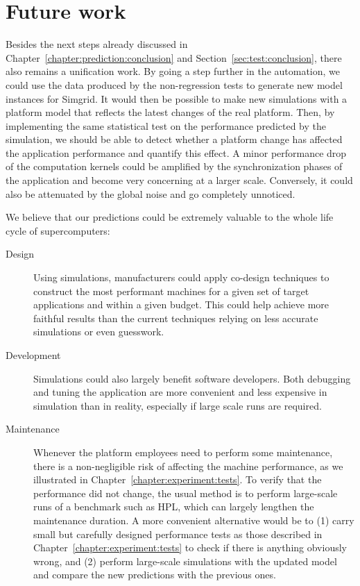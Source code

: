     \section{Future work}%

        Besides the next steps already discussed in Chapter~\ref{chapter:prediction:conclusion} and
        Section~\ref{sec:test:conclusion}, there also remains a unification work. By going a step further in the
        automation, we could use the data produced by the non-regression tests to generate new model instances for
        Simgrid. It would then be possible to make new simulations with a platform model that reflects the latest
        changes of the real platform. Then, by implementing the same statistical test on the performance predicted by
        the simulation, we should be able to detect whether a platform change has affected the application
        performance and quantify this effect. A minor performance drop of the computation kernels could be amplified by
        the synchronization phases of the application and become very concerning at a larger scale. Conversely, it could
        also be attenuated by the global noise and go completely unnoticed.

        We believe that our predictions could be extremely valuable to the whole life cycle of supercomputers:
        \begin{description}
            \item[Design] Using simulations, manufacturers could apply co-design techniques to construct the most
                performant machines for a given set of target applications and within a given budget. This could help
                achieve more faithful results than the current techniques relying on less accurate simulations or even
                guesswork.
            \item[Development] Simulations could also largely benefit software developers. Both debugging and tuning the
                application are more convenient and less expensive in simulation than in reality, especially if large
                scale runs are required.
            \item[Maintenance] Whenever the platform employees need to perform some maintenance, there is a
                non-negligible risk of affecting the machine performance, as we illustrated in
                Chapter~\ref{chapter:experiment:tests}. To verify that the performance did not change, the usual method
                is to perform large-scale runs of a benchmark such as HPL, which can largely lengthen the maintenance
                duration. A more convenient alternative would be to (1) carry small but carefully designed performance
                tests as those described in Chapter~\ref{chapter:experiment:tests} to check if there is anything
                obviously wrong, and (2) perform large-scale simulations with the updated model and compare the new
                predictions with the previous ones.
        \end{description}
